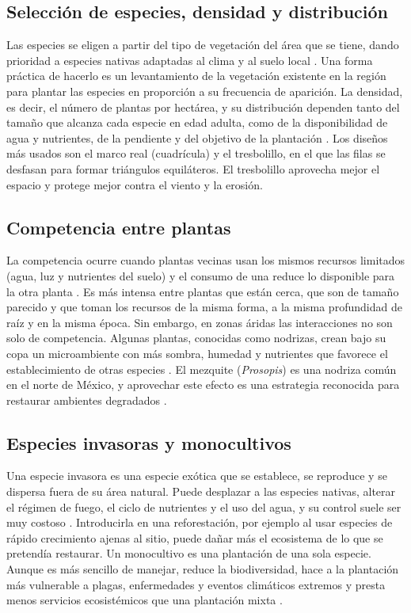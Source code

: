 \subsection{Selección de especies, densidad y distribución}
Las especies se eligen a partir del tipo de vegetación del área que se tiene, dando prioridad a especies nativas adaptadas al clima y al suelo local \autocite{conafor2010}. Una forma práctica de hacerlo es un levantamiento de la vegetación existente en la región para plantar las especies en proporción a su frecuencia de aparición.
La densidad, es decir, el número de plantas por hectárea, y su distribución dependen tanto del tamaño que alcanza cada especie en edad adulta, como de la disponibilidad de agua y nutrientes, de la pendiente y del objetivo de la plantación \autocite{conafor2010}. Los diseños más usados son el marco real (cuadrícula) y el tresbolillo, en el que las filas se desfasan para formar triángulos equiláteros. El tresbolillo aprovecha mejor el espacio y protege mejor contra el viento y la erosión.
 
\subsection{Competencia entre plantas}
La competencia ocurre cuando plantas vecinas usan los mismos recursos limitados (agua, luz y nutrientes del suelo) y el consumo de una reduce lo disponible para la otra planta \autocite{craine2013}. Es más intensa entre plantas que están cerca, que son de tamaño parecido y que toman los recursos de la misma forma, a la misma profundidad de raíz y en la misma época.
Sin embargo, en zonas áridas las interacciones no son solo de competencia. Algunas plantas, conocidas como nodrizas, crean bajo su copa un microambiente con más sombra, humedad y nutrientes que favorece el establecimiento de otras especies \autocite{flores2003}. El mezquite (\textit{Prosopis}) es una nodriza común en el norte de México, y aprovechar este efecto es una estrategia reconocida para restaurar ambientes degradados \autocite{padilla2006}.
 
\subsection{Especies invasoras y monocultivos}
Una especie invasora es una especie exótica que se establece, se reproduce y se dispersa fuera de su área natural. Puede desplazar a las especies nativas, alterar el régimen de fuego, el ciclo de nutrientes y el uso del agua, y su control suele ser muy costoso \autocite{mack2000}. Introducirla en una reforestación, por ejemplo al usar especies de rápido crecimiento ajenas al sitio, puede dañar más el ecosistema de lo que se pretendía restaurar.
Un monocultivo es una plantación de una sola especie. Aunque es más sencillo de manejar, reduce la biodiversidad, hace a la plantación más vulnerable a plagas, enfermedades y eventos climáticos extremos y presta menos servicios ecosistémicos que una plantación mixta \autocite{liu2018}.
 
